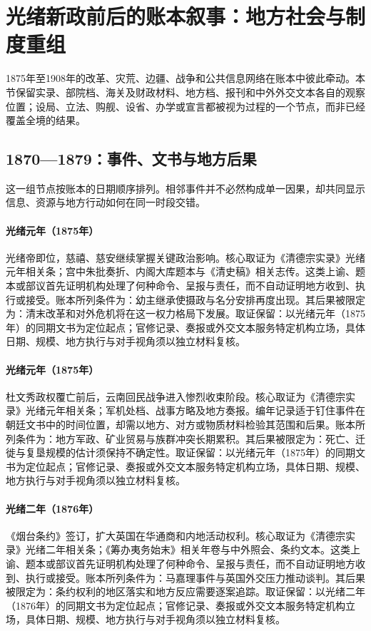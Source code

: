 \section{光绪新政前后的账本叙事：地方社会与制度重组}
1875年至1908年的改革、灾荒、边疆、战争和公共信息网络在账本中彼此牵动。本节保留实录、部院档、海关及财政材料、地方档、报刊和中外外交文本各自的观察位置；设局、立法、购舰、设省、办学或宣言都被视为过程的一个节点，而非已经覆盖全境的结果。
\subsection{1870—1879：事件、文书与地方后果}
这一组节点按账本的日期顺序排列。相邻事件并不必然构成单一因果，却共同显示信息、资源与地方行动如何在同一时段交错。
\hypertarget{ledger:EQ-1875-GUANGXU-ACCESSION}{}\paragraph{光绪元年（1875年）}光绪帝即位，慈禧、慈安继续掌握关键政治影响。核心取证为《清德宗实录》光绪元年相关条；宫中朱批奏折、内阁大库题本与《清史稿》相关志传。这类上谕、题本或部议首先证明机构处理了何种命令、呈报与责任，而不自动证明地方收到、执行或接受。账本所列条件为：幼主继承使摄政与名分安排再度出现。其后果被限定为：清末改革和对外危机将在这一权力格局下发展。取证保留：以光绪元年（1875年）的同期文书为定位起点；官修记录、奏报或外交文本服务特定机构立场，具体日期、规模、地方执行与对手视角须以独立材料复核。
\hypertarget{ledger:EQ-1875-YUNNAN-MUSLIM-WAR}{}\paragraph{光绪元年（1875年）}杜文秀政权覆亡前后，云南回民战争进入惨烈收束阶段。核心取证为《清德宗实录》光绪元年相关条；军机处档、战事方略及地方奏报。编年记录适于钉住事件在朝廷文书中的时间位置，却需以地方、对方或物质材料检验其范围和后果。账本所列条件为：地方军政、矿业贸易与族群冲突长期累积。其后果被限定为：死亡、迁徙与复垦规模的估计须保持不确定性。取证保留：以光绪元年（1875年）的同期文书为定位起点；官修记录、奏报或外交文本服务特定机构立场，具体日期、规模、地方执行与对手视角须以独立材料复核。
\hypertarget{ledger:EQ-1876-CHEFOO-CONVENTION}{}\paragraph{光绪二年（1876年）}《烟台条约》签订，扩大英国在华通商和内地活动权利。核心取证为《清德宗实录》光绪二年相关条；《筹办夷务始末》相关年卷与中外照会、条约文本。这类上谕、题本或部议首先证明机构处理了何种命令、呈报与责任，而不自动证明地方收到、执行或接受。账本所列条件为：马嘉理事件与英国外交压力推动谈判。其后果被限定为：条约权利的地区落实和地方反应需要逐案追踪。取证保留：以光绪二年（1876年）的同期文书为定位起点；官修记录、奏报或外交文本服务特定机构立场，具体日期、规模、地方执行与对手视角须以独立材料复核。
